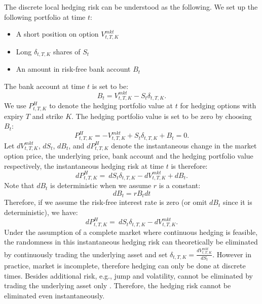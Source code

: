 \documentclass[letterpaper,12pt,titlepage,oneside,final]{book}
\numberwithin{equation}{section}
\theoremstyle{definition}
\newcommand{\Vmkt}{V^{mkt}}
\newcommand{\Smkt}{S}
\begin{document}
The discrete local hedging risk can be understood as the following.
We set up the following portfolio at time $t$:
\begin{itemize}
\item A short position on option $\Vmkt_{t,T,K}$
\item Long $\delta_{t,T,K}$ shares of $\Smkt_{t}$
\item An amount in risk-free bank account $B_t$
\end{itemize}
The bank account  at time $t$ is set to be: 
\[
    B_t=\Vmkt_{t,T,K}-\Smkt_{t} \delta_{t,T,K}.
\]
We use $P^{H}_{t,T,K}$ to denote the hedging portfolio value at $t$ for hedging options with expiry $T$ and strike $K$.
The hedging portfolio value is set to be zero by choosing $B_t$:
\[
    P^{H}_{t,T,K}=-\Vmkt_{t,T,K}+\Smkt_{t} \delta_{t,T,K} +B_t=0.
\]
Let  $d\Vmkt_{t,T,K}$, $d\Smkt_{t}$, $d B_t$, and $d P^{H}_{t,T,K}$ denote the instantaneous change in the market option price, the underlying price,  bank account and the hedging portfolio value respectively, the instantaneous hedging risk at time $t$ is therefore:
\begin{equation}
    d P^{H}_{t,T,K}=\ d\Smkt_{t} \delta_{t,T,K}-d \Vmkt_{t,T,K}+ d B_t.
\end{equation}
Note that $d B_t$ is deterministic when we assume $r$ is a constant:
\[
    d B_t=r B_{t} dt
\]
Therefore, if we assume the risk-free interest rate is zero (or omit $d B_t$ since it is deterministic), we have:
\begin{equation}\label{eq:HE}
    d P^{H}_{t,T,K}=\ d\Smkt_{t} \delta_{t,T,K}-d \Vmkt_{t,T,K}.
\end{equation}
Under the assumption of a complete market where continuous hedging is feasible, the randomness in this instantaneous hedging risk can theoretically be eliminated by continuously trading the underlying asset and set $\delta_{t,T,K}=\frac{d \Vmkt_{t,T,K}}{d\Smkt_{t}}$. However in practice, market is incomplete, therefore hedging can only be done at discrete times.
Besides additional risk, e.g., jump and volatility, cannot be eliminated by trading the underlying asset only \cite{heston1993closed,gatheral2011volatility}. 
 Therefore, the hedging risk cannot be eliminated even instantaneously. 
\end{document}
